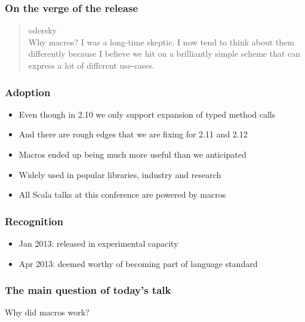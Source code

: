 \documentclass[svgnames,hyperref={bookmarks=false}]{beamer}
\begin{document}
\begin{frame}[fragile]
\frametitle{On the verge of the release}

\begin{quote}
odersky\\
Why macros? I was a long-time skeptic. I now tend to think about them differently
because I believe we hit on a brilliantly simple scheme that can express a lot of
different use-cases.
\end{quote}
\end{frame}

\begin{frame}[fragile]
\frametitle{}

\vskip40pt
\begin{center}
\end{center}
\end{frame}

\begin{frame}[fragile]
\frametitle{Adoption}

\begin{itemize}
\item Even though in 2.10 we only support expansion of typed method calls
\item And there are rough edges that we are fixing for 2.11 and 2.12
\item Macros ended up being much more useful than we anticipated
\item Widely used in popular libraries, industry and research
\item All Scala talks at this conference are powered by macros
\end{itemize}
\end{frame}

\begin{frame}[fragile]
\frametitle{Recognition}

\begin{itemize}
\item Jan 2013: released in experimental capacity
\item Apr 2013: deemed worthy of becoming part of language standard
\end{itemize}
\end{frame}

\begin{frame}[fragile]
\frametitle{The main question of today's talk}

Why did macros work?
\end{frame}
\end{document}
